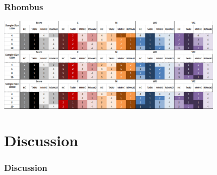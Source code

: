 \documentclass{beamer}
\begin{document}
\begin{frame}
\frametitle{Rhombus}
{\scriptsize{}
	\begin{center}
		\includegraphics[height=130pt]{images/Result_Rhombus}
	\end{center}
}
\end{frame}



\section{Discussion}
\begin{frame}
\frametitle{Discussion}
{\scriptsize{}
}
\end{frame}
\end{document}
